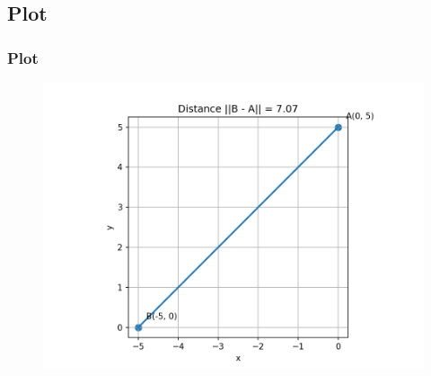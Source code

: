 \documentclass{beamer}
\theoremstyle{remark}
\numberwithin{equation}{section}
\begin{document}
\subsection{Plot}
\begin{frame}
    \frametitle{Plot}
\begin{figure}[H]
   \centering
   \includegraphics[width=0.9\columnwidth]{figures/distance.png}
   \end{figure}
\end{frame}
\end{document}
